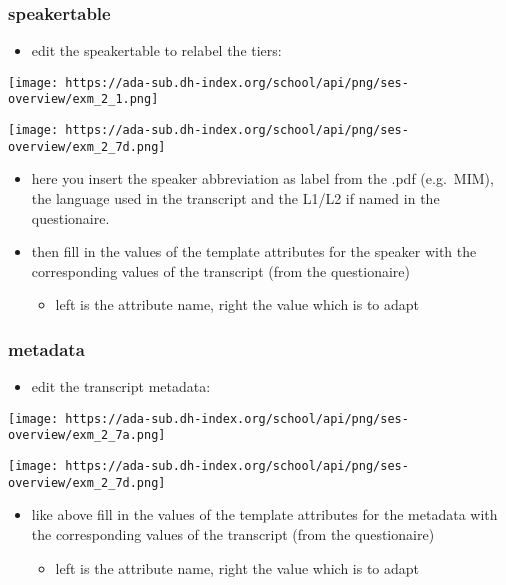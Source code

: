 \documentclass[
  12pt,
]{article}
\providecommand{\tightlist}{%
  \setlength{\itemsep}{0pt}\setlength{\parskip}{0pt}}
\begin{document}
\hypertarget{speakertable}{%
\subsubsection{speakertable}\label{speakertable}}

\begin{itemize}
\tightlist
\item
  edit the speakertable to relabel the tiers:
\end{itemize}

\texttt{[image: https://ada-sub.dh-index.org/school/api/png/ses-overview/exm\_2\_1.png]}

\texttt{[image: https://ada-sub.dh-index.org/school/api/png/ses-overview/exm\_2\_7d.png]}

\begin{itemize}
\tightlist
\item
  here you insert the speaker abbreviation as label from the .pdf
  (e.g.~MIM), the language used in the transcript and the L1/L2 if named
  in the questionaire.
\item
  then fill in the values of the template attributes for the speaker
  with the corresponding values of the transcript (from the
  questionaire)

  \begin{itemize}
  \tightlist
  \item
    left is the attribute name, right the value which is to adapt
  \end{itemize}
\end{itemize}

\hypertarget{metadata}{%
\subsubsection{metadata}\label{metadata}}

\begin{itemize}
\tightlist
\item
  edit the transcript metadata:
\end{itemize}

\texttt{[image: https://ada-sub.dh-index.org/school/api/png/ses-overview/exm\_2\_7a.png]}

\texttt{[image: https://ada-sub.dh-index.org/school/api/png/ses-overview/exm\_2\_7d.png]}

\begin{itemize}
\tightlist
\item
  like above fill in the values of the template attributes for the
  metadata with the corresponding values of the transcript (from the
  questionaire)

  \begin{itemize}
  \tightlist
  \item
    left is the attribute name, right the value which is to adapt
  \end{itemize}
\end{itemize}
\end{document}
